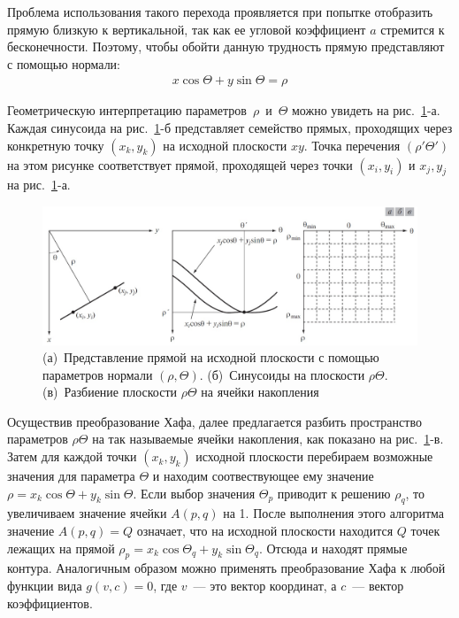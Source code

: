 \documentclass[12pt]{article} %
\begin{document}
Проблема использования такого перехода проявляется при попытке отобразить прямую близкую к вертикальной, так как ее угловой коэффициент $a$ стремится к бесконечности. Поэтому, чтобы обойти данную трудность прямую представляют с помощью нормали:
\begin{gather}\label{norm}
	x\cos{\Theta} + y\sin{\Theta} = \rho
\end{gather}

Геометрическую интерпретацию параметров~$\rho$~и~$\Theta$ можно увидеть на рис.~\ref{fig:norm}-а. Каждая синусоида на рис.~\ref{fig:norm}-б представляет семейство прямых, проходящих через конкретную точку $(x_k, y_k)$ на исходной плоскости $xy$. Точка перечения $(\rho'\Theta')$ на этом рисунке соответствует прямой, проходящей через точки $(x_i, y_i)$ и $x_j, y_j$ на рис.~\ref{fig:norm}-а.

\begin{figure}[h]
	
	\centering
	
	\includegraphics[width=0.8\linewidth]{norm.jpg}
	
	\caption{(а)~Представление прямой на исходной плоскости с помощью параметров нормали $(\rho, \Theta)$. 
	(б)~Синусоиды на плоскости $\rho \Theta$.
	(в)~Разбиение плоскости $\rho \Theta$ на ячейки накопления}
	
	\label{fig:norm}
	
\end{figure}

Осуществив преобразование Хафа, далее предлагается разбить пространство параметров $\rho \Theta$ на так называемые ячейки накопления, как показано на рис.~\ref{fig:norm}-в. Затем для каждой точки $(x_k, y_k)$ исходной плоскости перебираем возможные значения для параметра $\Theta$ и находим соотвествующее ему значение $\rho = x_k\cos{\Theta}+y_k\sin{\Theta}$. Если выбор значения $\Theta_p$ приводит к решению $\rho_q$, то увеличиваем значение ячейки $A(p,q)$ на 1. После выполнения этого алгоритма значение $A(p,q)=Q$ означает, что на исходной плоскости находится $Q$ точек лежащих на прямой $\rho_p = x_k\cos{\Theta_q}+y_k\sin{\Theta_q}$.
Отсюда и находят прямые контура. Аналогичным образом можно применять преобразование Хафа к любой функции вида $g(v,c) = 0$, где $v$~--- это вектор координат, а $c$~--- вектор коэффициентов.
\end{document}
